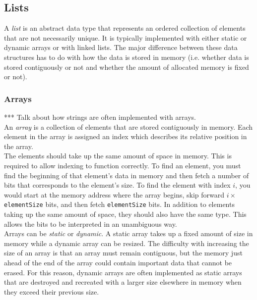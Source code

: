 

\subsection{Lists}


A \textit{list} is an abstract data type that represents an ordered collection of elements that are not necessarily unique. It is typically implemented with either static or dynamic arrays or with linked lists. The major difference between these data structures has to do with how the data is stored in memory (i.e. whether data is stored contiguously or not and whether the amount of allocated memory is fixed or not).

\subsubsection{Arrays}

*** Talk about how strings are often implemented with arrays. \\

An \textit{array} is a collection of elements that are stored contiguously in memory. Each element in the array is assigned an index which describes its relative position in the array.\\

The elements should take up the same amount of space in memory. This is required to allow indexing to function correctly. To find an element, you must find the beginning of that element's data in memory and then fetch a number of bits that corresponds to the element's size. To find the element with index $i$, you would start at the memory address where the array begins, skip forward $i\times$\texttt{elementSize} bits, and then fetch \texttt{elementSize} bits. In addition to elements taking up the same amount of space, they should also have the same type. This allows the bits to be interpreted in an unambiguous way.\\

Arrays can be \textit{static} or \textit{dynamic}. A static array takes up a fixed amount of size in memory while a dynamic array can be resized. The difficulty with increasing the size of an array is that an array must remain contiguous, but the memory just ahead of the end of the array could contain important data that cannot be erased. For this reason, dynamic arrays are often implemented as static arrays that are destroyed and recreated with a larger size elsewhere in memory when they exceed their previous size.

